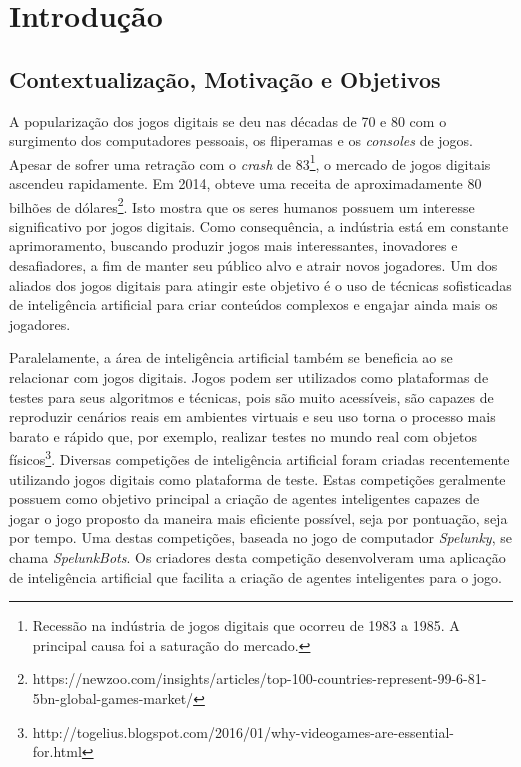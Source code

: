 \chapter{\label{chap:introduction}Introdução}
\section{\label{section:introduction} Contextualização, Motivação e Objetivos}
A popularização dos jogos digitais se deu nas décadas de 70 e 80 com o
surgimento dos computadores pessoais, os fliperamas e os \textit{consoles} de
jogos. Apesar de sofrer uma retração com o \textit{crash} de
83\footnote{Recessão na indústria de jogos digitais que ocorreu de 1983 a 1985.
A principal causa foi a saturação do mercado.}, o mercado de jogos digitais
ascendeu rapidamente. Em 2014, obteve uma receita de aproximadamente 80 bilhões
de
dólares\footnote{https://newzoo.com/insights/articles/top-100-countries-represent-99-6-81-5bn-global-games-market/}.
Isto mostra que os seres humanos possuem um interesse significativo por jogos
digitais. Como consequência, a indústria está em constante aprimoramento,
buscando produzir jogos mais interessantes, inovadores e desafiadores, a fim de
manter seu público alvo e atrair novos jogadores. Um dos aliados dos jogos
digitais para atingir este objetivo é o uso de técnicas sofisticadas de
inteligência artificial para criar conteúdos complexos e engajar ainda mais
os jogadores\cite{PanoramaAIGames}.

Paralelamente, a área de inteligência artificial também se beneficia ao se
relacionar com jogos digitais. Jogos podem ser utilizados como plataformas de
testes para seus algoritmos e técnicas, pois são muito acessíveis, são capazes
de reproduzir cenários reais em ambientes virtuais e seu uso torna o processo
mais barato e rápido que, por exemplo, realizar testes no mundo real com objetos
físicos\footnote{http://togelius.blogspot.com/2016/01/why-videogames-are-essential-for.html}.
Diversas competições de inteligência artificial foram criadas recentemente
utilizando jogos digitais como plataforma de teste\cite{GameAiCompetition}.
Estas competições geralmente possuem como objetivo principal a criação de
agentes inteligentes capazes de jogar o jogo proposto da maneira mais eficiente
possível, seja por pontuação, seja por tempo. Uma destas competições, baseada no
jogo de computador \textit{Spelunky}, se chama \textit{SpelunkBots}. Os
criadores desta competição desenvolveram uma aplicação de inteligência
artificial que facilita a criação de agentes inteligentes para o jogo.


